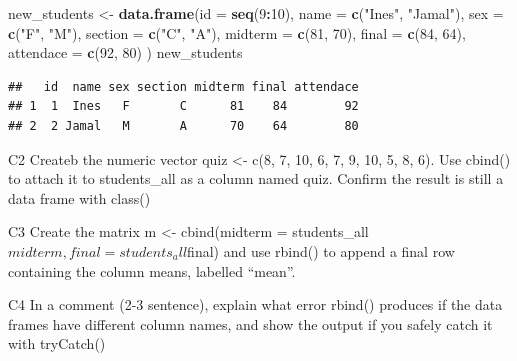 \documentclass[
]{article}
\newenvironment{Shaded}{\begin{snugshade}}{\end{snugshade}}
\newcommand{\AttributeTok}[1]{\textcolor[rgb]{0.13,0.29,0.53}{#1}}
\newcommand{\DecValTok}[1]{\textcolor[rgb]{0.00,0.00,0.81}{#1}}
\newcommand{\FunctionTok}[1]{\textcolor[rgb]{0.13,0.29,0.53}{\textbf{#1}}}
\newcommand{\NormalTok}[1]{#1}
\newcommand{\OtherTok}[1]{\textcolor[rgb]{0.56,0.35,0.01}{#1}}
\newcommand{\SpecialCharTok}[1]{\textcolor[rgb]{0.81,0.36,0.00}{\textbf{#1}}}
\newcommand{\StringTok}[1]{\textcolor[rgb]{0.31,0.60,0.02}{#1}}
\begin{document}
\begin{Shaded}
\begin{Highlighting}[]
\NormalTok{new\_students }\OtherTok{\textless{}{-}} \FunctionTok{data.frame}\NormalTok{(}\AttributeTok{id =} \FunctionTok{seq}\NormalTok{(}\DecValTok{9}\SpecialCharTok{:}\DecValTok{10}\NormalTok{),}
\AttributeTok{name =} \FunctionTok{c}\NormalTok{(}\StringTok{"Ines"}\NormalTok{, }\StringTok{"Jamal"}\NormalTok{), }
\AttributeTok{sex =} \FunctionTok{c}\NormalTok{(}\StringTok{"F"}\NormalTok{, }\StringTok{"M"}\NormalTok{), }
\AttributeTok{section =} \FunctionTok{c}\NormalTok{(}\StringTok{"C"}\NormalTok{, }\StringTok{"A"}\NormalTok{), }
\AttributeTok{midterm =} \FunctionTok{c}\NormalTok{(}\DecValTok{81}\NormalTok{, }\DecValTok{70}\NormalTok{), }
\AttributeTok{final =} \FunctionTok{c}\NormalTok{(}\DecValTok{84}\NormalTok{, }\DecValTok{64}\NormalTok{), }
\AttributeTok{attendace =} \FunctionTok{c}\NormalTok{(}\DecValTok{92}\NormalTok{, }\DecValTok{80}\NormalTok{)  }
\NormalTok{)}
\NormalTok{new\_students}
\end{Highlighting}
\end{Shaded}

\begin{verbatim}
##   id  name sex section midterm final attendace
## 1  1  Ines   F       C      81    84        92
## 2  2 Jamal   M       A      70    64        80
\end{verbatim}

C2 Createb the numeric vector quiz \textless- c(8, 7, 10, 6, 7, 9, 10,
5, 8, 6). Use cbind() to attach it to students\_all as a column named
quiz. Confirm the result is still a data frame with class()

C3 Create the matrix m \textless- cbind(midterm =
students\_all\(midterm, final = students_all\)final) and use rbind() to
append a final row containing the column means, labelled ``mean''.

C4 In a comment (2-3 sentence), explain what error rbind() produces if
the data frames have different column names, and show the output if you
safely catch it with tryCatch()
\end{document}
